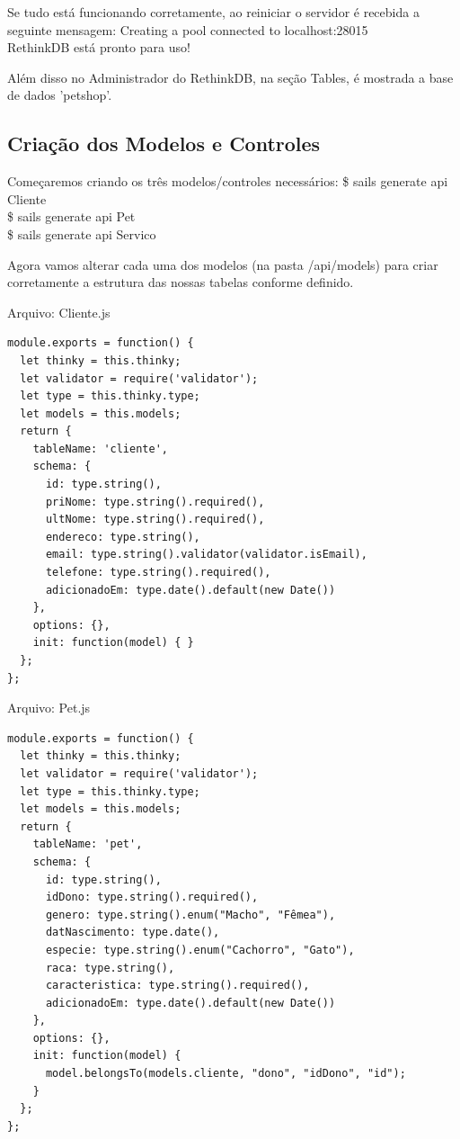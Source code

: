 \documentclass[a4paper,11pt]{article}
\begin{document}
Se tudo está funcionando corretamente, ao reiniciar o servidor é recebida a seguinte mensagem: 
{\ttfamily Creating a pool connected to localhost:28015 \\
RethinkDB está pronto para uso!}

Além disso no Administrador do RethinkDB, na seção Tables, é mostrada a base de 
dados 'petshop'.

\subsection{Criação dos Modelos e Controles}
Começaremos criando os três modelos/controles necessários:
{\ttfamily\$ sails generate api Cliente} \\
{\ttfamily\$ sails generate api Pet} \\
{\ttfamily\$ sails generate api Servico}

Agora vamos alterar cada uma dos modelos (na pasta /api/models) para criar
corretamente a estrutura das nossas tabelas conforme definido.

{\ttfamily Arquivo: Cliente.js}
\begin{lstlisting}
module.exports = function() {
  let thinky = this.thinky;
  let validator = require('validator');
  let type = this.thinky.type;
  let models = this.models;
  return {
    tableName: 'cliente',
    schema: {
      id: type.string(),
      priNome: type.string().required(),
      ultNome: type.string().required(),
      endereco: type.string(),
      email: type.string().validator(validator.isEmail),
      telefone: type.string().required(),
      adicionadoEm: type.date().default(new Date())
    },
    options: {},
    init: function(model) { }
  };
};
\end{lstlisting}

{\ttfamily Arquivo: Pet.js}
\begin{lstlisting}
module.exports = function() {
  let thinky = this.thinky;
  let validator = require('validator');
  let type = this.thinky.type;
  let models = this.models;
  return {
    tableName: 'pet',
    schema: {
      id: type.string(),
      idDono: type.string().required(),
      genero: type.string().enum("Macho", "Fêmea"),
      datNascimento: type.date(),
      especie: type.string().enum("Cachorro", "Gato"),
      raca: type.string(),
      caracteristica: type.string().required(),
      adicionadoEm: type.date().default(new Date())
    },
    options: {},
    init: function(model) {
      model.belongsTo(models.cliente, "dono", "idDono", "id");
    }
  };
};
\end{lstlisting}
\end{document}
